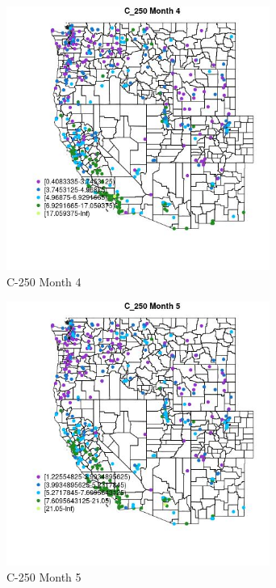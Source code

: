 \begin{figure} 
\centering  
\includegraphics[width=0.77\textwidth]{Code_Outputs/ML_input_report_ML_input_PM25_Step5_part_d_de_duplicated_aves_ML_input_MapObsMo4C_250.jpg} 
\caption{\label{fig:ML_input_report_ML_input_PM25_Step5_part_d_de_duplicated_aves_ML_inputMapObsMo4C_250}C-250 Month 4} 
\end{figure} 
 

\begin{figure} 
\centering  
\includegraphics[width=0.77\textwidth]{Code_Outputs/ML_input_report_ML_input_PM25_Step5_part_d_de_duplicated_aves_ML_input_MapObsMo5C_250.jpg} 
\caption{\label{fig:ML_input_report_ML_input_PM25_Step5_part_d_de_duplicated_aves_ML_inputMapObsMo5C_250}C-250 Month 5} 
\end{figure} 
 

